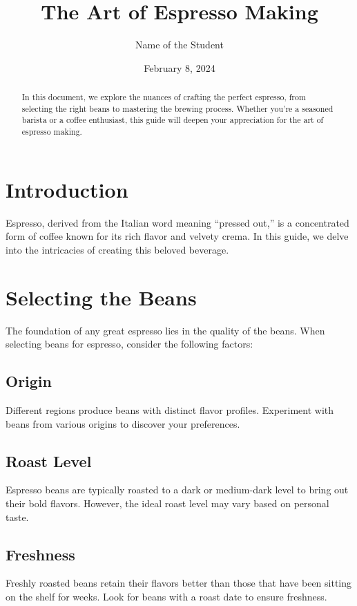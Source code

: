 \documentclass[12pt,a4paper]{article}
\title{\textbf{The Art of Espresso Making}}
\author{Name of the Student}
\date{February 8, 2024}
\begin{document}
\maketitle

\tableofcontents


\newpage
    
\begin{abstract}
    In this document, we explore the nuances of crafting the perfect espresso, from selecting the right beans to mastering the brewing process. Whether you’re a seasoned barista or a coffee enthusiast, this guide will deepen your appreciation for the art of espresso making.
\end{abstract}

\section{Introduction}
\justifying
Espresso, derived from the Italian word meaning “pressed out,” is a concentrated form of coffee known for its rich flavor and velvety crema. In this guide, we delve into the intricacies of creating this beloved beverage.

\section{Selecting the Beans}
The foundation of any great espresso lies in the quality of the beans. When selecting beans for espresso, consider the following factors:
\subsection{Origin}
Different regions produce beans with distinct flavor profiles. Experiment with beans from various origins to discover your preferences.
\subsection{Roast Level}
Espresso beans are typically roasted to a dark or medium-dark level to bring out their bold flavors. However, the ideal roast level may vary based on personal taste.
\subsection{Freshness}
Freshly roasted beans retain their flavors better than those that have been sitting on the shelf for weeks. Look for beans with a roast date to ensure freshness.
\end{document}
